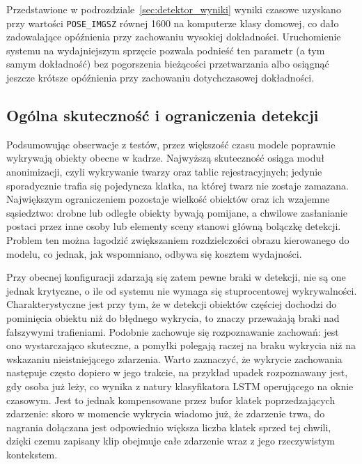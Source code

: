 Przedstawione w podrozdziale~\ref{sec:detektor_wyniki} wyniki czasowe uzyskano przy wartości \texttt{POSE\_IMGSZ} równej 1600 na komputerze klasy domowej, co dało zadowalające opóźnienia przy zachowaniu wysokiej dokładności. Uruchomienie systemu na wydajniejszym sprzęcie pozwala podnieść ten parametr (a tym samym dokładność) bez pogorszenia bieżącości przetwarzania albo osiągnąć jeszcze krótsze opóźnienia przy zachowaniu dotychczasowej dokładności.

\subsection{Ogólna skuteczność i ograniczenia detekcji}
Podsumowując obserwacje z testów, przez większość czasu modele poprawnie wykrywają obiekty obecne w kadrze. Najwyższą skuteczność osiąga moduł anonimizacji, czyli wykrywanie twarzy oraz tablic rejestracyjnych; jedynie sporadycznie trafia się pojedyncza klatka, na której twarz nie zostaje zamazana. Największym ograniczeniem pozostaje wielkość obiektów oraz ich wzajemne sąsiedztwo: drobne lub odległe obiekty bywają pomijane, a chwilowe zasłanianie postaci przez inne osoby lub elementy sceny stanowi główną bolączkę detekcji. Problem ten można łagodzić zwiększaniem rozdzielczości obrazu kierowanego do modelu, co jednak, jak wspomniano, odbywa się kosztem wydajności.

Przy obecnej konfiguracji zdarzają się zatem pewne braki w detekcji, nie są one jednak krytyczne, o ile od systemu nie wymaga się stuprocentowej wykrywalności. Charakterystyczne jest przy tym, że w detekcji obiektów częściej dochodzi do pominięcia obiektu niż do błędnego wykrycia, to znaczy przeważają braki nad fałszywymi trafieniami. Podobnie zachowuje się rozpoznawanie zachowań: jest ono wystarczająco skuteczne, a pomyłki polegają raczej na braku wykrycia niż na wskazaniu nieistniejącego zdarzenia. Warto zaznaczyć, że wykrycie zachowania następuje często dopiero w jego trakcie, na przykład upadek rozpoznawany jest, gdy osoba już leży, co wynika z natury klasyfikatora LSTM operującego na oknie czasowym. Jest to jednak kompensowane przez bufor klatek poprzedzających zdarzenie: skoro w momencie wykrycia wiadomo już, że zdarzenie trwa, do nagrania dołączana jest odpowiednio większa liczba klatek sprzed tej chwili, dzięki czemu zapisany klip obejmuje całe zdarzenie wraz z jego rzeczywistym kontekstem.
